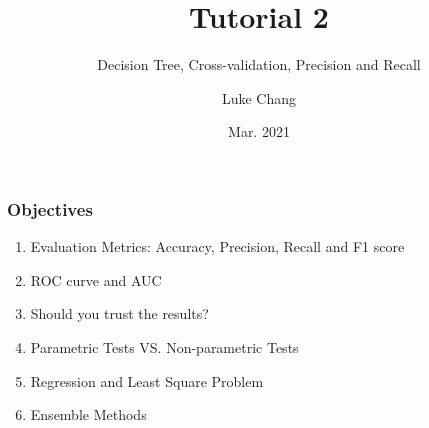 \documentclass[aspectratio=169, 10pt]{beamer}
\title{Tutorial 2}
\subtitle{Decision Tree, Cross-validation, Precision and Recall}
\author{Luke Chang}
\institute{The University of Auckland}
\date{Mar. 2021}
\begin{document}
\frame{\titlepage}

\begin{frame}
    \frametitle{Objectives}
    
    \begin{enumerate}
        \item Evaluation Metrics: Accuracy, Precision, Recall and F1 score
        \item ROC curve and AUC
        \item Should you trust the results?
        \item Parametric Tests VS. Non-parametric Tests
        \item Regression and Least Square Problem
        \item Ensemble Methods
    \end{enumerate}
    
\end{frame}
\end{document}

